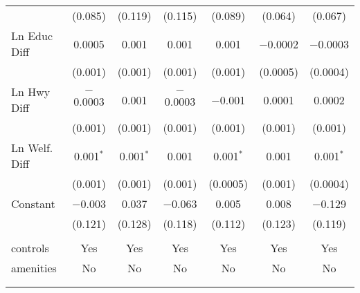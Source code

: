 \begin{table}[!htbp]
\begin{tabular}{@{\extracolsep{5pt}}lcccccc}
  & (0.085) & (0.119) & (0.115) & (0.089) & (0.064) & (0.067) \\ 
  Ln Educ Diff & 0.0005 & 0.001 & 0.001 & 0.001 & $-$0.0002 & $-$0.0003 \\ 
  & (0.001) & (0.001) & (0.001) & (0.001) & (0.0005) & (0.0004) \\ 
  Ln Hwy Diff & $-$0.0003 & 0.001 & $-$0.0003 & $-$0.001 & 0.0001 & 0.0002 \\ 
  & (0.001) & (0.001) & (0.001) & (0.001) & (0.001) & (0.001) \\ 
  Ln Welf. Diff & 0.001$^{*}$ & 0.001$^{*}$ & 0.001 & 0.001$^{*}$ & 0.001 & 0.001$^{*}$ \\ 
  & (0.001) & (0.001) & (0.001) & (0.0005) & (0.001) & (0.0004) \\ 
  Constant & $-$0.003 & 0.037 & $-$0.063 & 0.005 & 0.008 & $-$0.129 \\ 
  & (0.121) & (0.128) & (0.118) & (0.112) & (0.123) & (0.119) \\ 
 \hline \\[-1.8ex] 
controls & Yes & Yes & Yes & Yes & Yes & Yes \\ 
amenities & No & No & No & No & No & No \\ 
\hline \\[-1.8ex] 
\hline 
\hline \\[-1.8ex] 
\end{tabular} 
\end{table} 
